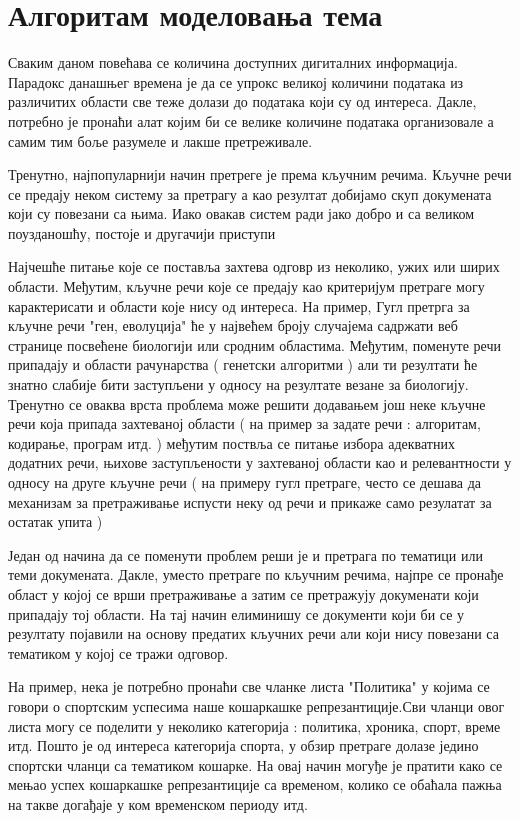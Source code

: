 \chapter{Алгоритам моделовања тема}

Сваким даном повећава се количина доступних дигиталних информација. Парадокс данашњег времена је да се упрокс великој количини података из различитих области све  теже долази до  података који су од интереса. Дакле, потребно је пронаћи алат којим би се велике количине података организовале а самим тим боље разумеле и лакше претреживале.

Тренутно, најпопуларнији начин претреге је према кључним речима. Кључне речи се предају неком систему за претрагу а као резултат добијамо скуп докумената који су повезани са њима. Иако овакав систем ради јако добро и са великом поузданошћу, постоје и другачији приступи %

Најчешће питање које се поставља захтева одговр из неколико, ужих или ширих области. Међутим, кључне речи које се предају као критеријум претраге могу карактерисати и области које нису од интереса. На пример, Гугл претрга за кључне речи "ген, еволуција" ће у највећем броју случајема садржати веб странице посвећене биологији или сродним областима. Међутим, поменуте речи припадају и области рачунарства ( генетски алгоритми ) али ти резултати ће знатно слабије бити заступљени у односу на резултате везане за биологију. Тренутно се оваква врста проблема може решити додавањем још неке кључне речи која припада захтеваној области ( на пример за задате речи : алгоритам, кодирање, програм итд. ) међутим поствља се питање избора адекватних додатних речи, њихове заступљености у  захтеваној области као и релевантности у односу на друге кључне речи ( на примеру гугл претраге, често се дешава да механизам за претраживање испусти неку од речи и прикаже само резулатат за остатак упита )

Један од начина да се поменути проблем реши је и  претрага по тематици или теми докумената. Дакле, уместо претраге по кључним речима, најпре се пронађе област у  којој се врши претраживање а затим се  претражују докуменати који припадају тој области. На тај начин елиминишу се документи који би се у резултату појавили на основу предатих кључних речи али који нису повезани са  тематиком у којој се тражи одговор. 

На пример, нека је потребно пронаћи све чланке листа "Политика" у којима се говори о спортским успесима наше кошаркашке репрезантиције.Сви чланци овог листа могу се поделити у неколико категорија : политика, хроника, спорт, време итд. Пошто је од интереса категорија спорта, у обзир претраге долазе једино спортски чланци са тематиком  кошарке. На овај начин могуђе је пратити  како се мењао успех  кошаркашке репрезантиције са временом, колико се обаћала пажња на такве догађаје у ком временском периоду итд.

